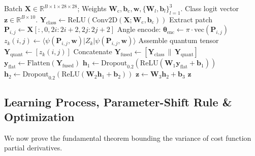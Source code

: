 \documentclass[journal]{IEEEtran}
\begin{document}
\begin{algorithm}[!htbp]
\caption{QC-CNN-Parallel Forward Inference and Feature Fusion}
\label{alg:forward_pass}
\begin{algorithmic}[1]
\REQUIRE Batch $\mathbf{X} \in \mathbb{R}^{B \times 1 \times 28 \times 28}$; Weights $\mathbf{W}_{\mathrm{c}}, \mathbf{b}_{\mathrm{c}}, \mathbf{w}, \{\mathbf{W}_l, \mathbf{b}_l\}_{l=1}^3$.
\ENSURE Class logit vector $\mathbf{z} \in \mathbb{R}^{B \times 10}$.
\STATE {}
\STATE $\mathbf{Y}_{\mathrm{class}} \leftarrow \mathrm{ReLU}(\mathrm{Conv2D}(\mathbf{X}; \mathbf{W}_{\mathrm{c}}, \mathbf{b}_{\mathrm{c}}))$
\STATE {}
        \STATE Extract patch $\mathbf{P}_{i,j} \leftarrow \mathbf{X}[:, 0, 2i:2i+2, 2j:2j+2]$
        \STATE Angle encode: $\boldsymbol{\theta}_{\mathrm{enc}} \leftarrow \pi \cdot \mathrm{vec}(\mathbf{P}_{i,j})$
            \STATE $z_k(i, j) \leftarrow \langle \psi(\mathbf{P}_{i,j}, \mathbf{w}) | Z_k | \psi(\mathbf{P}_{i,j}, \mathbf{w}) \rangle$
        \ENDFOR
    \ENDFOR
\ENDFOR
\STATE Assemble quantum tensor $\mathbf{Y}_{\mathrm{quant}} \leftarrow [z_k(i, j)]$
\STATE {}
\STATE Concatenate $\mathbf{Y}_{\mathrm{fused}} \leftarrow [\mathbf{Y}_{\mathrm{class}} \,\|\, \mathbf{Y}_{\mathrm{quant}}]$
\STATE $\mathbf{y}_{\mathrm{flat}} \leftarrow \mathrm{Flatten}(\mathbf{Y}_{\mathrm{fused}})$
\STATE $\mathbf{h}_1 \leftarrow \mathrm{Dropout}_{0.2}(\mathrm{ReLU}(\mathbf{W}_1 \mathbf{y}_{\mathrm{flat}} + \mathbf{b}_1))$
\STATE $\mathbf{h}_2 \leftarrow \mathrm{Dropout}_{0.2}(\mathrm{ReLU}(\mathbf{W}_2 \mathbf{h}_1 + \mathbf{b}_2))$
\STATE $\mathbf{z} \leftarrow \mathbf{W}_3 \mathbf{h}_2 + \mathbf{b}_3$
\RETURN $\mathbf{z}$
\end{algorithmic}
\end{algorithm}

\subsection{Learning Process, Parameter-Shift Rule \& Optimization}
We now prove the fundamental theorem bounding the variance of cost function partial derivatives.
\end{document}
